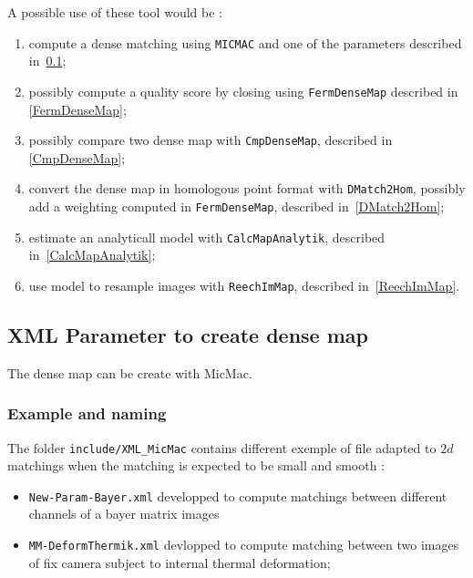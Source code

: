 A possible use of these tool would be :

\begin{enumerate}
   \item compute a dense matching using {\tt MICMAC} and one of the parameters described in~\ref{XMLDeneMatch};
   \item possibly compute a quality score by closing using {\tt FermDenseMap} described in \ref{FermDenseMap};
   \item possibly compare two dense map with {\tt CmpDenseMap}, described in \ref{CmpDenseMap};
   \item convert the dense map in homologous point format with {\tt DMatch2Hom}, 
         possibly add a weighting computed in {\tt FermDenseMap},
         described in~\ref{DMatch2Hom};
   \item estimate an analyticall model with {\tt CalcMapAnalytik}, described in~\ref{CalcMapAnalytik};
   \item use model to resample images with  {\tt ReechImMap}, described in~\ref{ReechImMap}.
\end{enumerate}



\subsection{XML Parameter to create dense map}
\label{XMLDeneMatch}

The dense map can be create with MicMac.


\subsubsection{Example and naming}

\label{NameDM2}

The folder {\tt include/XML\_MicMac} contains different exemple of file
adapted to $2d$ matchings when the matching is expected to be small and smooth :

\begin{itemize}
   \item {\tt New-Param-Bayer.xml} developped to compute matchings between 
         different channels of a bayer matrix images

   \item {\tt MM-DeformThermik.xml} devlopped to compute matching between
         two images of fix camera subject to internal thermal deformation;
\end{itemize}

